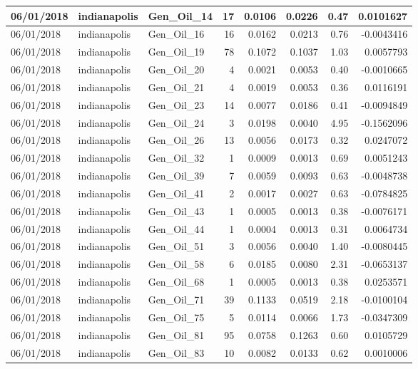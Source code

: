 \documentclass[
  letterpaper,
  DIV=11,
  numbers=noendperiod]{scrartcl}
\begin{document}
\begin{tabular}{l|l|l|r|r|r|r|r}
\hline
06/01/2018 & indianapolis & Gen\_Oil\_14 & 17 & 0.0106 & 0.0226 & 0.47 & 0.0101627\\
\hline
06/01/2018 & indianapolis & Gen\_Oil\_16 & 16 & 0.0162 & 0.0213 & 0.76 & -0.0043416\\
\hline
06/01/2018 & indianapolis & Gen\_Oil\_19 & 78 & 0.1072 & 0.1037 & 1.03 & 0.0057793\\
\hline
06/01/2018 & indianapolis & Gen\_Oil\_20 & 4 & 0.0021 & 0.0053 & 0.40 & -0.0010665\\
\hline
06/01/2018 & indianapolis & Gen\_Oil\_21 & 4 & 0.0019 & 0.0053 & 0.36 & 0.0116191\\
\hline
06/01/2018 & indianapolis & Gen\_Oil\_23 & 14 & 0.0077 & 0.0186 & 0.41 & -0.0094849\\
\hline
06/01/2018 & indianapolis & Gen\_Oil\_24 & 3 & 0.0198 & 0.0040 & 4.95 & -0.1562096\\
\hline
06/01/2018 & indianapolis & Gen\_Oil\_26 & 13 & 0.0056 & 0.0173 & 0.32 & 0.0247072\\
\hline
06/01/2018 & indianapolis & Gen\_Oil\_32 & 1 & 0.0009 & 0.0013 & 0.69 & 0.0051243\\
\hline
06/01/2018 & indianapolis & Gen\_Oil\_39 & 7 & 0.0059 & 0.0093 & 0.63 & -0.0048738\\
\hline
06/01/2018 & indianapolis & Gen\_Oil\_41 & 2 & 0.0017 & 0.0027 & 0.63 & -0.0784825\\
\hline
06/01/2018 & indianapolis & Gen\_Oil\_43 & 1 & 0.0005 & 0.0013 & 0.38 & -0.0076171\\
\hline
06/01/2018 & indianapolis & Gen\_Oil\_44 & 1 & 0.0004 & 0.0013 & 0.31 & 0.0064734\\
\hline
06/01/2018 & indianapolis & Gen\_Oil\_51 & 3 & 0.0056 & 0.0040 & 1.40 & -0.0080445\\
\hline
06/01/2018 & indianapolis & Gen\_Oil\_58 & 6 & 0.0185 & 0.0080 & 2.31 & -0.0653137\\
\hline
06/01/2018 & indianapolis & Gen\_Oil\_68 & 1 & 0.0005 & 0.0013 & 0.38 & 0.0253571\\
\hline
06/01/2018 & indianapolis & Gen\_Oil\_71 & 39 & 0.1133 & 0.0519 & 2.18 & -0.0100104\\
\hline
06/01/2018 & indianapolis & Gen\_Oil\_75 & 5 & 0.0114 & 0.0066 & 1.73 & -0.0347309\\
\hline
06/01/2018 & indianapolis & Gen\_Oil\_81 & 95 & 0.0758 & 0.1263 & 0.60 & 0.0105729\\
\hline
06/01/2018 & indianapolis & Gen\_Oil\_83 & 10 & 0.0082 & 0.0133 & 0.62 & 0.0010006\\

\end{tabular}
\end{document}
